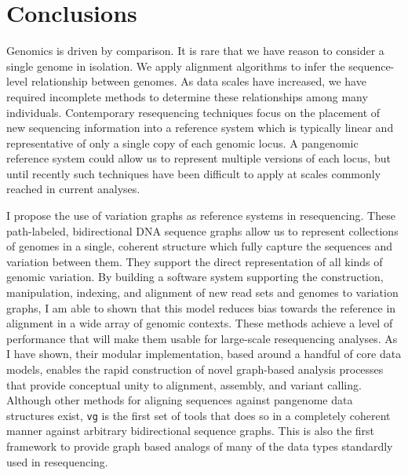 %
\chapter{Conclusions}

\ifpdf
    \graphicspath{{Chapter3/Figs/Raster/}{Chapter3/Figs/PDF/}{Chapter3/Figs/}}
\else
    \graphicspath{{Chapter3/Figs/Vector/}{Chapter3/Figs/}}
\fi

Genomics is driven by comparison.
It is rare that we have reason to consider a single genome in isolation.
We apply alignment algorithms to infer the sequence-level relationship between genomes.
As data scales have increased, we have required incomplete methods to determine these relationships among many individuals.
Contemporary resequencing techniques focus on the placement of new sequencing information into a reference system which is typically linear and representative of only a single copy of each genomic locus.
A pangenomic reference system could allow us to represent multiple versions of each locus, but until recently such techniques have been difficult to apply at scales commonly reached in current analyses.

I propose the use of variation graphs as reference systems in resequencing.
These path-labeled, bidirectional DNA sequence graphs allow us to represent collections of genomes in a single, coherent structure which fully capture the sequences and variation between them.
They support the direct representation of all kinds of genomic variation.
By building a software system supporting the construction, manipulation, indexing, and alignment of new read sets and genomes to variation graphs, I am able to shown that this model reduces bias towards the reference in alignment in a wide array of genomic contexts.
These methods achieve a level of performance that will make them usable for large-scale resequencing analyses.
As I have shown, their modular implementation, based around a handful of core data models, enables the rapid construction of novel graph-based analysis processes that provide conceptual unity to alignment, assembly, and variant calling.
Although other methods for aligning sequences against pangenome data structures exist, {\tt vg} is the first set of tools that does so in a completely coherent manner against arbitrary bidirectional sequence graphs.
This is also the first framework to provide graph based analogs of many of the data types standardly used in resequencing.

